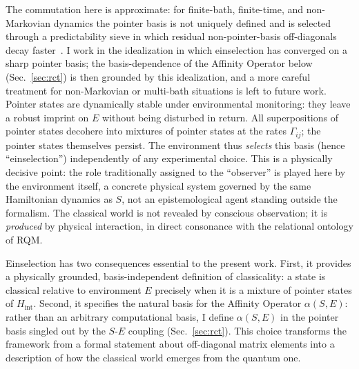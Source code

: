 The commutation here is approximate: for finite-bath, finite-time, and
non-Markovian dynamics the pointer basis is not uniquely defined and
is selected through a predictability sieve in which residual
non-pointer-basis off-diagonals decay
faster~\cite{Schlosshauer2005,Zurek2003}.
I work in the idealization in which einselection has converged on a
sharp pointer basis; the basis-dependence of the Affinity Operator below
(Sec.~\ref{sec:rct}) is then grounded by this idealization, and a more
careful treatment for non-Markovian or multi-bath situations is left
to future work.
Pointer states are dynamically stable under environmental
monitoring: they leave a robust imprint on $E$ without being
disturbed in return.
All superpositions of pointer states decohere into mixtures of pointer
states at the rates $\Gamma_{ij}$; the pointer states themselves
persist.
The environment thus \emph{selects} this basis (hence ``einselection'') independently of any experimental choice.
This is a physically decisive point: the role traditionally assigned
to the ``observer'' is played here by the environment itself, a concrete physical system governed by the same Hamiltonian dynamics as
$S$, not an epistemological agent standing outside the formalism.
The classical world is not revealed by conscious observation; it is
\emph{produced} by physical interaction, in direct consonance with the
relational ontology of RQM.

Einselection has two consequences essential to the present work.
First, it provides a physically grounded, basis-independent definition
of classicality: a state is classical relative to environment $E$
precisely when it is a mixture of pointer states of $H_{\mathrm{int}}$.
Second, it specifies the natural basis for the Affinity Operator
$\alpha(S, E)$: rather than an arbitrary computational basis,
I define $\alpha(S, E)$ in the pointer basis singled out by the
$S$-$E$ coupling (Sec.~\ref{sec:rct}).
This choice transforms the framework from a formal statement about
off-diagonal matrix elements into a description of how the classical
world emerges from the quantum one.

